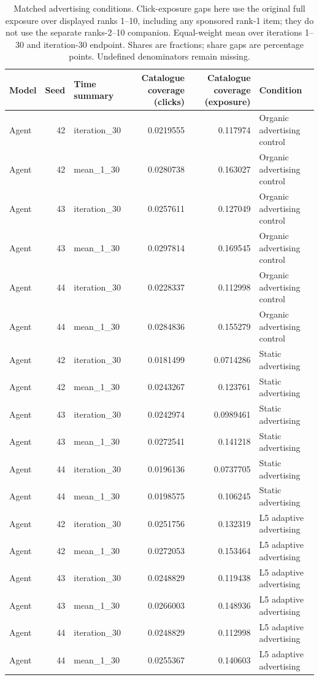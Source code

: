 \begin{table}[htbp!]
\centering
\small
\setlength{\tabcolsep}{3pt}
\renewcommand{\arraystretch}{1.1}
\begin{tabular}{lrlrrl}
\hline
Model & Seed & Time summary & Catalogue coverage (clicks) & Catalogue coverage (exposure) & Condition \\
\hline
Agent & 42 & iteration\_30 & 0.0219555 & 0.117974 & Organic advertising control \\
Agent & 42 & mean\_1\_30 & 0.0280738 & 0.163027 & Organic advertising control \\
Agent & 43 & iteration\_30 & 0.0257611 & 0.127049 & Organic advertising control \\
Agent & 43 & mean\_1\_30 & 0.0297814 & 0.169545 & Organic advertising control \\
Agent & 44 & iteration\_30 & 0.0228337 & 0.112998 & Organic advertising control \\
Agent & 44 & mean\_1\_30 & 0.0284836 & 0.155279 & Organic advertising control \\
Agent & 42 & iteration\_30 & 0.0181499 & 0.0714286 & Static advertising \\
Agent & 42 & mean\_1\_30 & 0.0243267 & 0.123761 & Static advertising \\
Agent & 43 & iteration\_30 & 0.0242974 & 0.0989461 & Static advertising \\
Agent & 43 & mean\_1\_30 & 0.0272541 & 0.141218 & Static advertising \\
Agent & 44 & iteration\_30 & 0.0196136 & 0.0737705 & Static advertising \\
Agent & 44 & mean\_1\_30 & 0.0198575 & 0.106245 & Static advertising \\
Agent & 42 & iteration\_30 & 0.0251756 & 0.132319 & L5 adaptive advertising \\
Agent & 42 & mean\_1\_30 & 0.0272053 & 0.153464 & L5 adaptive advertising \\
Agent & 43 & iteration\_30 & 0.0248829 & 0.119438 & L5 adaptive advertising \\
Agent & 43 & mean\_1\_30 & 0.0266003 & 0.148936 & L5 adaptive advertising \\
Agent & 44 & iteration\_30 & 0.0248829 & 0.112998 & L5 adaptive advertising \\
Agent & 44 & mean\_1\_30 & 0.0255367 & 0.140603 & L5 adaptive advertising \\
\hline
\end{tabular}
\caption{Matched advertising conditions. Click-exposure gaps here use the original full exposure over displayed ranks 1--10, including any sponsored rank-1 item; they do not use the separate ranks-2--10 companion. Equal-weight mean over iterations 1--30 and iteration-30 endpoint. Shares are fractions; share gaps are percentage points. Undefined denominators remain missing.}
\label{chap:results:tab:rq1_advertising_coverage}
\end{table}
